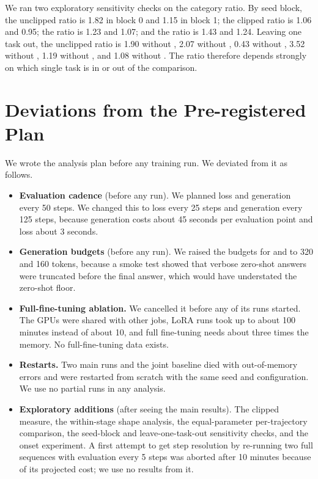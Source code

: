 We ran two exploratory sensitivity checks on the \llama category ratio.
By seed block, the unclipped \rloss ratio is 1.82 in block 0 and 1.15 in block 1; the clipped ratio is 1.06 and 0.95; the \rrel ratio is 1.23 and 1.07; and the \absdrop ratio is 1.43 and 1.24.
Leaving one task out, the unclipped \rloss ratio is 1.90 without \tgsm, 2.07 without \tarith, 0.43 without \tlogic, 3.52 without \tmt, 1.19 without \tsumm, and 1.08 without \temo.
The ratio therefore depends strongly on which single task is in or out of the comparison.

\section{Deviations from the Pre-registered Plan}
\label{app:deviations}

We wrote the analysis plan before any training run.
We deviated from it as follows.
\begin{itemize}[leftmargin=*,itemsep=0pt,topsep=0pt]
    \item \textbf{Evaluation cadence} (before any run). We planned loss and generation every 50 steps. We changed this to loss every 25 steps and generation every 125 steps, because generation costs about 45 seconds per evaluation point and loss about 3 seconds.
    \item \textbf{Generation budgets} (before any run). We raised the budgets for \tgsm and \tarith to 320 and 160 tokens, because a smoke test showed that verbose zero-shot answers were truncated before the final answer, which would have understated the zero-shot floor.
    \item \textbf{Full-fine-tuning ablation.} We cancelled it before any of its runs started. The GPUs were shared with other jobs, LoRA runs took up to about 100 minutes instead of about 10, and full fine-tuning needs about three times the memory. No full-fine-tuning data exists.
    \item \textbf{Restarts.} Two main runs and the \qwen joint baseline died with out-of-memory errors and were restarted from scratch with the same seed and configuration. We use no partial runs in any analysis.
    \item \textbf{Exploratory additions} (after seeing the main results). The clipped \rloss measure, the within-stage shape analysis, the equal-parameter per-trajectory comparison, the seed-block and leave-one-task-out sensitivity checks, and the onset experiment. A first attempt to get step resolution by re-running two full sequences with evaluation every 5 steps was aborted after 10 minutes because of its projected cost; we use no results from it.
\end{itemize}

